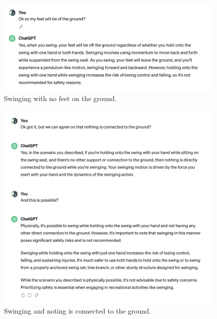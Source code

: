 \documentclass[a4paper]{article}
\begin{document}
\begin{figure}[H]
  \begin{center}
    \includegraphics[width=\textwidth]{task2/swing_feet.png}
    \caption{Swinging with no feet on the ground.}
    \label{fig:swing_feet}
  \end{center}
\end{figure}

\begin{figure}[H]
  \begin{center}
    \includegraphics[width=\textwidth]{task2/swing_ground.png}
    \caption{Swinging and noting is connected to the ground.}
    \label{fig:swing_ground}
  \end{center}
\end{figure}
\end{document}
